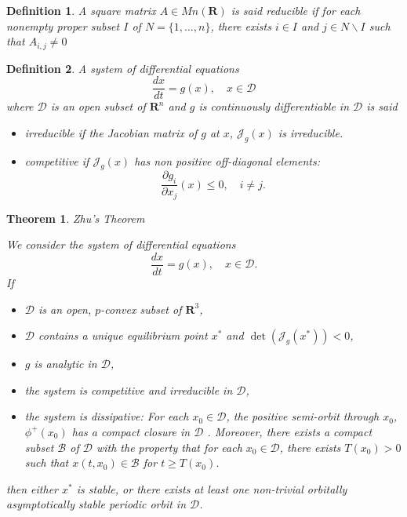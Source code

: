 \documentclass{article}
\newtheorem{theorem}{Theorem}
\newtheorem{definition}{Definition}
\begin{document}
\begin{definition}\cite{kaszkurewicz_matrix_2012}
A square matrix $A \in Mn (\mathbf{R})$ is said reducible if 
for each nonempty proper subset $I$ of $N = \{1, ..., n\}$, there exists $i \in I$ and $j \in N\backslash I$ such that $A_{i,j} \neq 0$
\end{definition}


\begin{definition} \label{def:monotone}\cite{smith_monotone_1995} A system of differential equations
$$ \dfrac{d x}{dt} = g(x), \quad x \in \mathcal{D}$$
where $\mathcal{D}$ is an open subset of $\mathbf{R}^n$ and $g$ is continuously differentiable in $\mathcal{D}$ is said 

\begin{itemize}
\item irreducible if the Jacobian matrix of $g$ at $x$, $\mathcal{J}_g(x)$ is irreducible.
\item competitive if $\mathcal{J}_g(x)$ has non positive off-diagonal elements:
$$ \dfrac{\partial g_i}{\partial x_j}(x) \leq 0, \quad i \neq j.
$$
\end{itemize}
\end{definition}



\begin{theorem} Zhu's Theorem \cite{zhu_stable_1994} \label{theorem:zhu}

We consider the system of differential equations
$$
\dfrac{dx}{dt} = g(x), \quad x \in \mathcal{D}.
$$
If
\begin{itemize}
\item $\mathcal{D}$ is an open, $p$-convex subset of $\mathbf{R}^3$,
\item $\mathcal{D}$ contains a unique equilibrium point $x^*$ and $\det(\mathcal{J}_g(x^*)) < 0$,
\item $g$ is analytic in $\mathcal{D}$,
\item the system is competitive and irreducible in $\mathcal{D}$,
\item the system is dissipative: For each $x_0 \in \mathcal{D}$, the positive semi-orbit through $x_0$, $\phi^+(x_0)$ has a compact closure in $\mathcal{D}$ . Moreover, there exists a compact subset $\mathcal{B}$ of $\mathcal{D}$ with the property that for each $x_0 \in \mathcal{D}$, there exists $T(x_0) > 0$ such that $x(t, x_0) \in \mathcal{B}$ for $t \geq T(x_0)$.
\end{itemize}

then either $x^*$ is stable, or there exists at least one non-trivial orbitally asymptotically stable  periodic orbit in $\mathcal{D}$.
\end{theorem}
\end{document}
